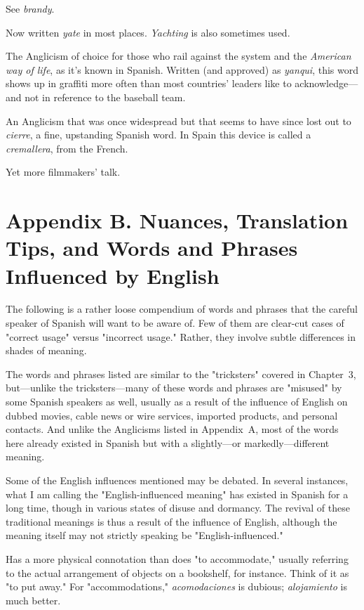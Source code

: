  See \emph{brandy}.

 Now written \emph{yate} in most places. \emph{Yachting} is also
sometimes used.

 The Anglicism of choice for those who rail against
the system and the \emph{American way of life}, as it's known in Spanish.
Written (and approved) as \emph{yanqui}, this word shows up in graffiti more
often than most countries' leaders like to acknowledge---and not in
reference to the baseball team.

 An Anglicism that was once widespread but that
seems to have since lost out to \emph{cierre}, a fine, upstanding Spanish
word. In Spain this device is called a \emph{cremallera}, from the French.

 Yet more filmmakers' talk.

\chapter{Appendix B. Nuances, Translation Tips, and Words and Phrases Influenced by English}

The following is a rather loose compendium of words and
phrases that the careful speaker of Spanish will want to be aware of.
Few of them are clear-cut cases of "correct usage" versus "incorrect usage." Rather, they involve subtle differences in shades of meaning.

The words and phrases listed are similar to the "tricksters"
covered in Chapter~3, but---unlike the tricksters---many of these words
and phrases are "misused" by some Spanish speakers as well, usually
as a result of the influence of English on dubbed movies, cable news
or wire services, imported products, and personal contacts. And unlike the Anglicisms listed in Appendix~A, most of the words here already
existed in Spanish but with a slightly---or markedly---different meaning.

Some of the English influences mentioned may be debated. In
several instances, what I am calling the "English-influenced meaning"
has existed in Spanish for a long time, though in various states of disuse and dormancy. The revival of these traditional meanings is thus a
result of the influence of English, although the meaning itself may not
strictly speaking be "English-influenced."

\bsk

 Has a more physical connotation than does "to
accommodate," usually referring to the actual arrangement of objects on a bookshelf, for instance. Think of it as "to put away." For "accommodations," \emph{acomodaciones} is dubious; \emph{alojamiento} is much better.

